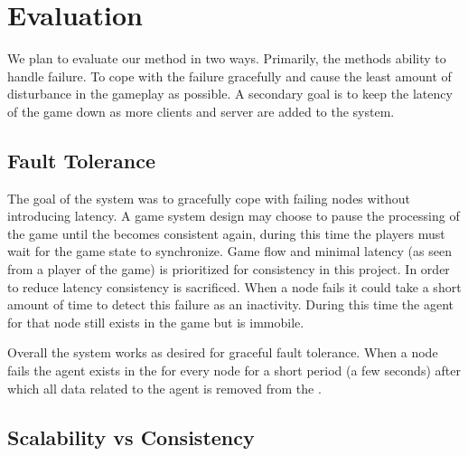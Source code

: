 

\section{Evaluation}
\label{sec:evaluation}

We plan to evaluate our method in two ways. Primarily, the methods ability to handle failure. To cope with the failure gracefully and cause the least amount of disturbance in the gameplay as possible. A secondary goal is to keep the latency of the game down as more clients and server are added to the system.

\subsection{Fault Tolerance}

The goal of the system was to gracefully cope with failing nodes without introducing latency. 
A game system design may choose to pause the processing of the game until the \gamestate becomes consistent again, during this time the players must wait for the game state to synchronize.
Game flow and minimal latency (as seen from a player of the game) is prioritized for consistency in this project.
In order to reduce latency consistency is sacrificed. 
When a node fails it could take a short amount of time to detect this failure as an inactivity.
During this time the agent for that node still exists in the game but is immobile.

Overall the system works as desired for graceful fault tolerance.
When a node fails the agent exists in the \gamestate for every node for a short period (a few seconds) after which all data related to the agent is removed from the \gamestate.

\subsection{Scalability vs Consistency}

